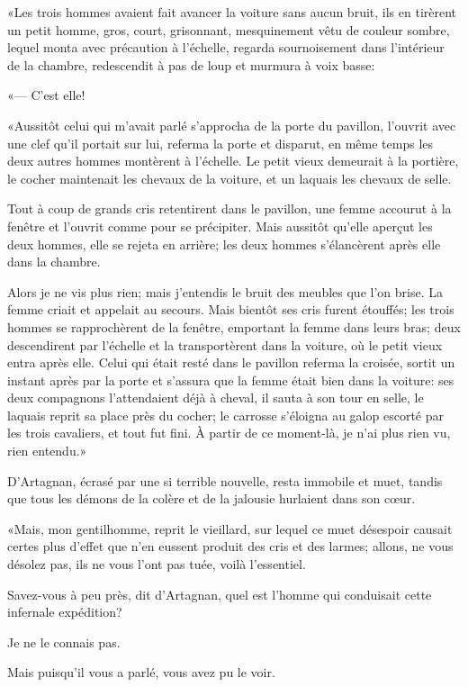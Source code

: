 «Les trois hommes avaient fait avancer la voiture sans aucun bruit, ils en tirèrent un petit homme, gros, court, grisonnant, mesquinement vêtu de couleur sombre, lequel monta avec précaution à l'échelle, regarda sournoisement dans l'intérieur de la chambre, redescendit à pas de loup et murmura à voix basse: 

«--- C'est elle! 

«Aussitôt celui qui m'avait parlé s'approcha de la porte du pavillon, l'ouvrit avec une clef qu'il portait sur lui, referma la porte et disparut, en même temps les deux autres hommes montèrent à l'échelle. Le petit vieux demeurait à la portière, le cocher maintenait les chevaux de la voiture, et un laquais les chevaux de selle. 

Tout à coup de grands cris retentirent dans le pavillon, une femme accourut à la fenêtre et l'ouvrit comme pour se précipiter. Mais aussitôt qu'elle aperçut les deux hommes, elle se rejeta en arrière; les deux hommes s'élancèrent après elle dans la chambre. 

Alors je ne vis plus rien; mais j'entendis le bruit des meubles que l'on brise. La femme criait et appelait au secours. Mais bientôt ses cris furent étouffés; les trois hommes se rapprochèrent de la fenêtre, emportant la femme dans leurs bras; deux descendirent par l'échelle et la transportèrent dans la voiture, où le petit vieux entra après elle. Celui qui était resté dans le pavillon referma la croisée, sortit un instant après par la porte et s'assura que la femme était bien dans la voiture: ses deux compagnons l'attendaient déjà à cheval, il sauta à son tour en selle, le laquais reprit sa place près du cocher; le carrosse s'éloigna au galop escorté par les trois cavaliers, et tout fut fini. À partir de ce moment-là, je n'ai plus rien vu, rien entendu.» 

D'Artagnan, écrasé par une si terrible nouvelle, resta immobile et muet, tandis que tous les démons de la colère et de la jalousie hurlaient dans son cœur. 

«Mais, mon gentilhomme, reprit le vieillard, sur lequel ce muet désespoir causait certes plus d'effet que n'en eussent produit des cris et des larmes; allons, ne vous désolez pas, ils ne vous l'ont pas tuée, voilà l'essentiel. 

\speak  Savez-vous à peu près, dit d'Artagnan, quel est l'homme qui conduisait cette infernale expédition? 

\speak  Je ne le connais pas. 

\speak  Mais puisqu'il vous a parlé, vous avez pu le voir. 


